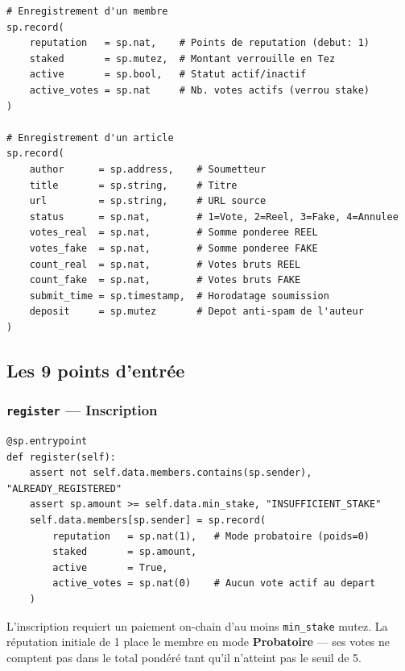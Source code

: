 \documentclass[12pt,a4paper]{article}
\newenvironment{infobox}[1][Info]{%
  \begin{tcolorbox}[
    enhanced, breakable,
    colback=accent!8, colframe=accent!70, coltitle=white,
    title=\textbf{#1}, fonttitle=\small,
    arc=4pt, boxrule=0.8pt,
    left=6pt, right=6pt, top=5pt, bottom=5pt
  ]
}{\end{tcolorbox}}
\newcommand{\entrypoint}[1]{\textcolor{primary}{\texttt{\textbf{#1}}}}
\begin{document}
\begin{lstlisting}[language=SmartPy, caption={Structure Member et NewsItem}]
# Enregistrement d'un membre
sp.record(
    reputation   = sp.nat,    # Points de reputation (debut: 1)
    staked       = sp.mutez,  # Montant verrouille en Tez
    active       = sp.bool,   # Statut actif/inactif
    active_votes = sp.nat     # Nb. votes actifs (verrou stake)
)

# Enregistrement d'un article
sp.record(
    author      = sp.address,    # Soumetteur
    title       = sp.string,     # Titre
    url         = sp.string,     # URL source
    status      = sp.nat,        # 1=Vote, 2=Reel, 3=Fake, 4=Annulee
    votes_real  = sp.nat,        # Somme ponderee REEL
    votes_fake  = sp.nat,        # Somme ponderee FAKE
    count_real  = sp.nat,        # Votes bruts REEL
    count_fake  = sp.nat,        # Votes bruts FAKE
    submit_time = sp.timestamp,  # Horodatage soumission
    deposit     = sp.mutez       # Depot anti-spam de l'auteur
)
\end{lstlisting}

\subsection{Les 9 points d'entrée}

\subsubsection{\entrypoint{register} — Inscription}

\begin{lstlisting}[language=SmartPy, caption={Entrypoint register}]
@sp.entrypoint
def register(self):
    assert not self.data.members.contains(sp.sender), "ALREADY_REGISTERED"
    assert sp.amount >= self.data.min_stake, "INSUFFICIENT_STAKE"
    self.data.members[sp.sender] = sp.record(
        reputation   = sp.nat(1),   # Mode probatoire (poids=0)
        staked       = sp.amount,
        active       = True,
        active_votes = sp.nat(0)    # Aucun vote actif au depart
    )
\end{lstlisting}

\begin{infobox}[Logique register]
L'inscription requiert un paiement on-chain d'au moins \texttt{min\_stake} mutez. La réputation initiale de 1 place le membre en mode \textbf{Probatoire} --- ses votes ne comptent pas dans le total pondéré tant qu'il n'atteint pas le seuil de 5.
\end{infobox}
\end{document}
